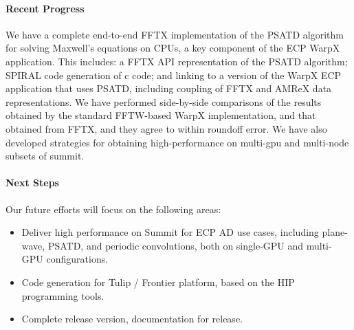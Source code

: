 \paragraph{Recent Progress}

We have a complete end-to-end FFTX implementation of the PSATD algorithm for solving Maxwell's equations on CPUs, a key component of the ECP WarpX application. This includes: a FFTX API representation of the PSATD algorithm; SPIRAL code generation of c code; and linking to a version of the WarpX ECP application that uses PSATD, including coupling of FFTX and AMReX data representations. We have performed side-by-side comparisons of the results obtained by the standard FFTW-based WarpX implementation, and that obtained from FFTX, and they agree to within roundoff error.
We have also developed strategies for obtaining high-performance on multi-gpu and multi-node subsets of summit.

\paragraph{Next Steps} Our future efforts will focus on the following areas:
\begin{itemize}
\item Deliver high performance on Summit for ECP AD use cases, including plane-wave, PSATD, and periodic convolutions, both on single-GPU and multi-GPU configurations.
\item Code generation for Tulip / Frontier platform, based on the HIP programming tools.
\item Complete release version, documentation for release.
\end{itemize}



